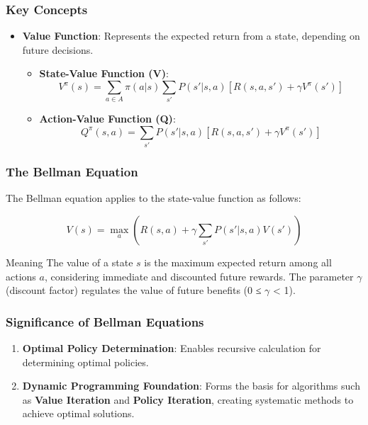 \documentclass[aspectratio=169]{beamer}
\begin{document}
\begin{frame}[fragile]
    \frametitle{Key Concepts}
    \begin{itemize}
        \item \textbf{Value Function}: Represents the expected return from a state, depending on future decisions.
        
            \begin{itemize}
                \item \textbf{State-Value Function (V)}:
                \begin{equation}
                    V^\pi(s) = \sum_{a \in A} \pi(a|s) \sum_{s'} P(s'|s, a) \left[R(s, a, s') + \gamma V^\pi(s')\right]
                \end{equation}
                
                \item \textbf{Action-Value Function (Q)}:
                \begin{equation}
                    Q^\pi(s, a) = \sum_{s'} P(s'|s, a) \left[R(s, a, s') + \gamma V^\pi(s')\right]
                \end{equation}
            \end{itemize}
    \end{itemize}
\end{frame}

\begin{frame}[fragile]
    \frametitle{The Bellman Equation}
    The Bellman equation applies to the state-value function as follows:
    
    \begin{equation}
        V(s) = \max_a \left( R(s, a) + \gamma \sum_{s'} P(s'|s, a) V(s') \right)
    \end{equation}

    \begin{block}{Meaning}
        The value of a state \( s \) is the maximum expected return among all actions \( a \), considering immediate and discounted future rewards. The parameter \( \gamma \) (discount factor) regulates the value of future benefits (0 ≤ \( \gamma \) < 1).
    \end{block}
\end{frame}

\begin{frame}[fragile]
    \frametitle{Significance of Bellman Equations}
    
    \begin{enumerate}
        \item \textbf{Optimal Policy Determination}: Enables recursive calculation for determining optimal policies.
        \item \textbf{Dynamic Programming Foundation}: Forms the basis for algorithms such as \textbf{Value Iteration} and \textbf{Policy Iteration}, creating systematic methods to achieve optimal solutions.
    \end{enumerate}
\end{frame}
\end{document}
